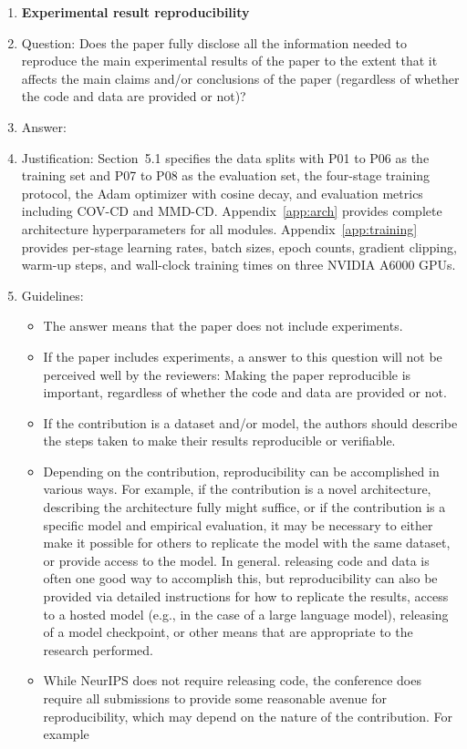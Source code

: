 \begin{enumerate}
    \item {\bf Experimental result reproducibility}
    \item[] Question: Does the paper fully disclose all the information needed to reproduce the main experimental results of the paper to the extent that it affects the main claims and/or conclusions of the paper (regardless of whether the code and data are provided or not)?
    \item[] Answer: \answerYes{}
    \item[] Justification: Section~5.1 specifies the data splits with P01 to P06 as the training set and P07 to P08 as the evaluation set, the four-stage training protocol, the Adam optimizer with cosine decay, and evaluation metrics including COV-CD and MMD-CD. Appendix~\ref{app:arch} provides complete architecture hyperparameters for all modules. Appendix~\ref{app:training} provides per-stage learning rates, batch sizes, epoch counts, gradient clipping, warm-up steps, and wall-clock training times on three NVIDIA A6000 GPUs.
    \item[] Guidelines:
    \begin{itemize}
        \item The answer \answerNA{} means that the paper does not include experiments.
        \item If the paper includes experiments, a \answerNo{} answer to this question will not be perceived well by the reviewers: Making the paper reproducible is important, regardless of whether the code and data are provided or not.
        \item If the contribution is a dataset and\slash or model, the authors should describe the steps taken to make their results reproducible or verifiable.
        \item Depending on the contribution, reproducibility can be accomplished in various ways. For example, if the contribution is a novel architecture, describing the architecture fully might suffice, or if the contribution is a specific model and empirical evaluation, it may be necessary to either make it possible for others to replicate the model with the same dataset, or provide access to the model. In general. releasing code and data is often one good way to accomplish this, but reproducibility can also be provided via detailed instructions for how to replicate the results, access to a hosted model (e.g., in the case of a large language model), releasing of a model checkpoint, or other means that are appropriate to the research performed.
        \item While NeurIPS does not require releasing code, the conference does require all submissions to provide some reasonable avenue for reproducibility, which may depend on the nature of the contribution. For example

\end{itemize}
\end{enumerate}
